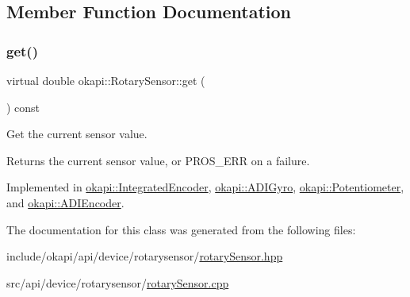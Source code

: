 \subsection{Member Function Documentation}
\mbox{\label{classokapi_1_1RotarySensor_ac5534dc6c3bcbd8ea2f4e54a04cda734}} 
\subsubsection{\texorpdfstring{get()}{get()}}
{\footnotesize\ttfamily virtual double okapi\+::\+Rotary\+Sensor\+::get (\begin{DoxyParamCaption}{ }\end{DoxyParamCaption}) const\hspace{0.3cm}{\ttfamily [pure virtual]}}

Get the current sensor value.

\begin{DoxyReturn}{Returns}
the current sensor value, or {\ttfamily P\+R\+O\+S\+\_\+\+E\+RR} on a failure. 
\end{DoxyReturn}


Implemented in \mbox{\hyperlink{classokapi_1_1IntegratedEncoder_af3fe091ddf4b7f36443a5616bfedc3cb}{okapi\+::\+Integrated\+Encoder}}, \mbox{\hyperlink{classokapi_1_1ADIGyro_a3a4a0a319c723091aad0b2125d701ca4}{okapi\+::\+A\+D\+I\+Gyro}}, \mbox{\hyperlink{classokapi_1_1Potentiometer_ad81adf2cb10b830272e9a553b668fc4b}{okapi\+::\+Potentiometer}}, and \mbox{\hyperlink{classokapi_1_1ADIEncoder_a1728a39cdb3e87e7c650961f34608f75}{okapi\+::\+A\+D\+I\+Encoder}}.



The documentation for this class was generated from the following files\+:\begin{DoxyCompactItemize}
\item 
include/okapi/api/device/rotarysensor/\mbox{\hyperlink{rotarySensor_8hpp}{rotary\+Sensor.\+hpp}}\item 
src/api/device/rotarysensor/\mbox{\hyperlink{rotarySensor_8cpp}{rotary\+Sensor.\+cpp}}\end{DoxyCompactItemize}
